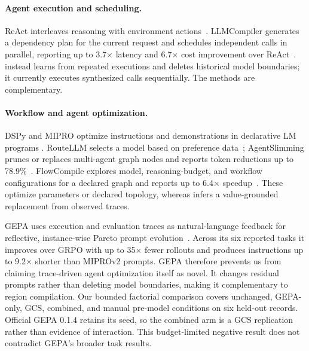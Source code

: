 \begin{table}[t]
  \centering
  \caption{Adjacent optimizers by what they consume, what they rewrite, which safety
  conditions are hard rather than learned, and what licenses deployment.  The last column
  is where \method{} differs: every other row admits on a metric, a profile, or a test,
  none on a finite-sample selective bound.}
  \label{tab:related-work}
  \small
  
\end{table}

\paragraph{Agent execution and scheduling.}
ReAct interleaves reasoning with environment actions~\cite{yao2023react}.
LLMCompiler generates a dependency plan for the current request and schedules independent
calls in parallel, reporting up to 3.7$\times$ latency and 6.7$\times$ cost improvement
over ReAct~\cite{kim2024llmcompiler}.  \method instead learns from repeated executions and
deletes historical model boundaries; it currently executes synthesized calls sequentially.
The methods are complementary.

\paragraph{Workflow and agent optimization.}
DSPy and MIPRO optimize instructions and demonstrations in declarative LM programs
\cite{khattab2024dspy,opsahlong2024mipro}.  RouteLLM selects a model based on preference
data~\cite{ong2025routellm}; AgentSlimming prunes or replaces multi-agent graph nodes and
reports token reductions up to 78.9\%~\cite{chen2026agentslimming}.  FlowCompile explores
model, reasoning-budget, and workflow configurations for a declared graph and reports up
to 6.4$\times$ speedup~\cite{li2026flowcompile}.  These optimize parameters or declared
topology, whereas \method infers a value-grounded replacement from observed traces.

GEPA uses execution and evaluation traces as natural-language feedback for reflective,
instance-wise Pareto prompt evolution~\cite{agrawal2026gepa}.  Across its six reported
tasks it improves over GRPO with up to 35$\times$ fewer rollouts and produces instructions
up to 9.2$\times$ shorter than MIPROv2 prompts. GEPA therefore prevents us from claiming
trace-driven agent optimization itself as novel. It changes residual prompts rather than
deleting model boundaries, making it complementary to region compilation. Our bounded
factorial comparison covers unchanged, GEPA-only, GCS, combined, and manual pre-model
conditions on six held-out records. Official GEPA 0.1.4 retains its seed, so the combined
arm is a GCS replication rather than evidence of interaction. This budget-limited negative
result does not contradict GEPA's broader task results.

